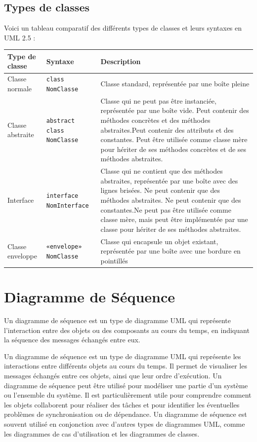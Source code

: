 \subsection{Types de classes}
Voici un tableau comparatif des différents types de classes et leurs syntaxes en UML 2.5 :

\begin{tabular}{p{4cm}|p{4cm}|p{8cm}}
\toprule
\textbf{Type de classe} & \textbf{Syntaxe} & \textbf{Description} \\
\midrule
Classe normale & \texttt{class NomClasse} & Classe standard, représentée par une boîte pleine \\
\midrule
Classe abstraite & \texttt{abstract class NomClasse} & Classe qui ne peut pas être instanciée, représentée par une boîte vide.
Peut contenir des méthodes concrètes et des méthodes abstraites.Peut contenir des attributs et des constantes. Peut être utilisée comme classe mère pour hériter de ses méthodes concrètes et de ses méthodes abstraites. \\
\midrule
Interface & \texttt{interface NomInterface} & Classe qui ne contient que des méthodes abstraites, représentée par une boîte avec des lignes brisées. Ne peut contenir que des méthodes abstraites. Ne peut contenir que des constantes.Ne peut pas être utilisée comme classe mère, mais peut être implémentée par une classe pour hériter de ses méthodes abstraites. \\
\midrule
Classe enveloppe & \texttt{«envelope» NomClasse} & Classe qui encapsule un objet existant, représentée par une boîte avec une bordure en pointillés \\
\bottomrule
\end{tabular}


\newpage
\section{Diagramme de Séquence}\label{sec:diagrammesequence}

\begin{definition}
Un diagramme de séquence est un type de diagramme UML qui représente l'interaction entre des objets ou des composants au cours du temps, en indiquant la séquence des messages échangés entre eux.

Un diagramme de séquence est un type de diagramme UML qui représente les interactions entre différents objets au cours du temps. Il permet de visualiser les messages échangés entre ces objets, ainsi que leur ordre d'exécution. Un diagramme de séquence peut être utilisé pour modéliser une partie d'un système ou l'ensemble du système. Il est particulièrement utile pour comprendre comment les objets collaborent pour réaliser des tâches et pour identifier les éventuelles problèmes de synchronisation ou de dépendance. Un diagramme de séquence est souvent utilisé en conjonction avec d'autres types de diagrammes UML, comme les diagrammes de cas d'utilisation et les diagrammes de classes.
\end{definition}

